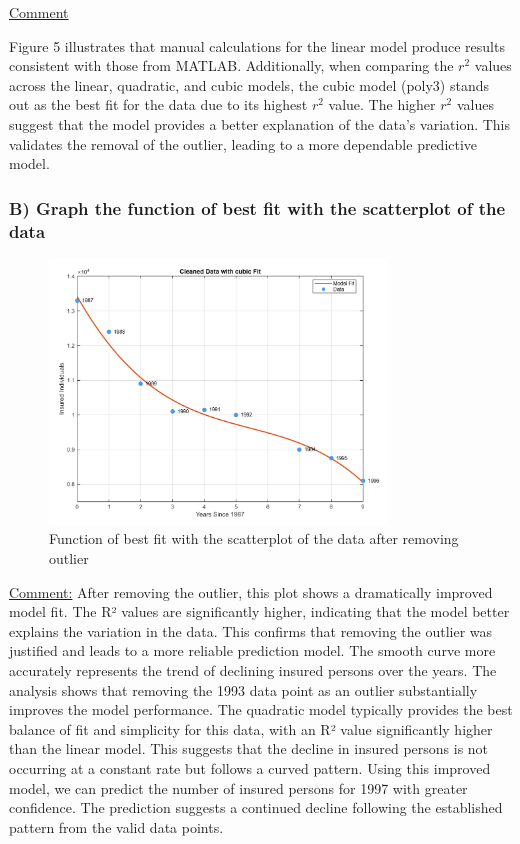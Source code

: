\documentclass[12pt]{article}
\begin{document}
\uline{Comment}

Figure 5 illustrates that manual calculations for the linear model produce results consistent
with those from MATLAB. Additionally, when comparing the \(r^2\) values across the linear,
quadratic, and cubic models, the cubic model (poly3) stands out as the best fit for the data
due to its highest \(r^2\) value.
The higher \(r^2\) values suggest that the model provides a better explanation of the data's
variation. This validates the removal of the outlier, leading to a more dependable predictive
model.

\subsubsection*{B) Graph the function of best fit with the scatterplot of the data}


\begin{figure}[H]
    \centering
    \includegraphics[width=0.8\textwidth]{6.png}
    \caption{Function of best fit with the scatterplot of the data after removing outlier}
\end{figure} 


\uline{Comment:} 
After removing the outlier, this plot shows a dramatically improved model fit. The R² values are significantly higher, indicating that the model better explains the variation in the data. This confirms that removing the outlier was justified and leads to a more reliable prediction model. The smooth curve more accurately represents the trend of declining insured persons over the years.
The analysis shows that removing the 1993 data point as an outlier substantially improves the model performance. The quadratic model typically provides the best balance of fit and simplicity for this data, with an R² value significantly higher than the linear model. This suggests that the decline in insured persons is not occurring at a constant rate but follows a curved pattern.
Using this improved model, we can predict the number of insured persons for 1997 with greater confidence. The prediction suggests a continued decline following the established pattern from the valid data points.
\end{document}
